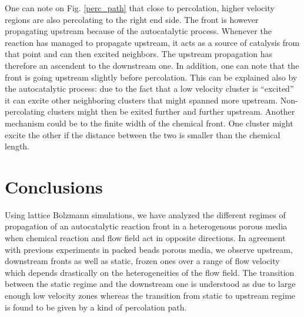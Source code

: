 \documentclass[doublecol]{epl2}
\begin{document}
One can note on Fig. \ref{perc_path} that close to percolation, higher velocity regions are also percolating to the right end side. The front is however propagating upstream because of the autocatalytic process. Whenever the reaction has managed to propagate upstream, it acts as a source of catalysis from that point and can then excited neighbors. The upstream propagation has therefore an ascendent to the downstream one.
In addition, one can note that the front is going upstream slightly before percolation. This can be explained also by the autocatalytic process: due to the fact that a low velocity cluster is ``excited'' it can excite other neighboring clusters that might spanned more upstream. Non-percolating clusters might then be exited further and further upstream.
Another mechanism could be to the finite width of the chemical front. One cluster might excite the other if the distance between the two is smaller than the chemical length.


\section{Conclusions}
Using lattice Bolzmann simulations, we have analyzed the different regimes of propagation of an autocatalytic reaction front in a heterogenous porous media when chemical reaction and flow field act in opposite directions. In agreement with previous experiments in packed beads porous media, we observe upstream, downstream fronts as well as static, frozen ones over a range of flow velocity which depends drastically on the heterogeneities of the flow field. The transition between the static regime and the downstream one is understood as due to large enough low velocity zones whereas the transition from static to upstream regime is found to be given by a kind of percolation path.




 	
	
\end{document}
